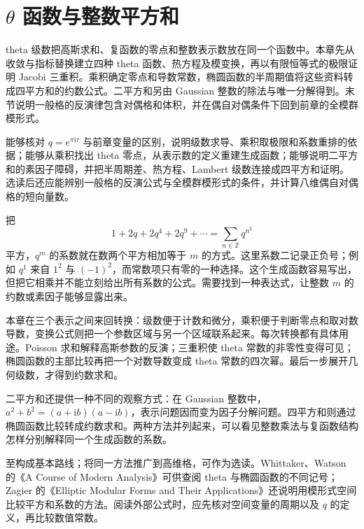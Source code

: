 \chapter{\texorpdfstring{\(\theta\)}{\AnalysisPdfTheta} 函数与整数平方和}
\label{b3:ch:24}
\begin{chapterabstract}
theta 级数把高斯求和、复函数的零点和整数表示数放在同一个函数中。本章先从收敛与指标替换建立四种 theta 函数、热方程及模变换，再以有限恒等式的极限证明 Jacobi 三重积。乘积确定零点和导数常数，椭圆函数的半周期值将这些资料转成四平方和的约数公式。二平方和另由 Gaussian 整数的除法与唯一分解得到。末节说明一般格的反演律包含对偶格和体积，并在偶自对偶条件下回到前章的全模群模形式。
\end{chapterabstract}

\begin{learninggoals}
能够核对 \(q=e^{\pi\mathrm{i}\tau}\) 与前章变量的区别，说明级数求导、乘积取极限和系数重排的依据；能够从乘积找出 theta 零点，从表示数的定义重建生成函数；能够说明二平方和的素因子障碍，并把半周期差、热方程、Lambert 级数连接成四平方和证明。选读后还应能辨别一般格的反演公式与全模群模形式的条件，并计算八维偶自对偶格的短向量数。
\end{learninggoals}

把
\[
1+2q+2q^4+2q^9+\cdots
=\sum_{n\in\mathbb Z}q^{n^2}
\]
平方，\(q^m\) 的系数就在数两个平方相加等于 \(m\) 的方式。这里系数二记录正负号；例如 \(q^1\) 来自 \(1^2\) 与 \((-1)^2\)，而常数项只有零的一种选择。这个生成函数容易写出，但把它相乘并不能立刻给出所有系数的公式。需要找到一种表达式，让整数 \(m\) 的约数或素因子能够显露出来。

本章在三个表示之间来回转换：级数便于计数和微分，乘积便于判断零点和取对数导数，变换公式则把一个参数区域与另一个区域联系起来。每次转换都有具体用途。Poisson 求和解释高斯参数的反演；三重积使 theta 常数的非零性变得可见；椭圆函数的主部比较再把一个对数导数变成 theta 常数的四次幂。最后一步展开几何级数，才得到约数求和。

\ProseParagraphBreak
二平方和还提供一种不同的观察方式：在 Gaussian 整数中，\(a^2+b^2=(a+\mathrm ib)(a-\mathrm ib)\)，表示问题因而变为因子分解问题。四平方和则通过椭圆函数比较转成约数求和。两种方法并列起来，可以看见整数乘法与复函数结构怎样分别解释同一个生成函数的系数。

至构成基本路线；将同一方法推广到高维格，可作为选读。Whittaker、Watson 的《A Course of Modern Analysis》\cite{Whittaker1996Course}可供查阅 theta 与椭圆函数的不同记号；Zagier 的《Elliptic Modular Forms and Their Applications》\cite[pp. 26--28]{Zagier2008Elliptic}还说明用模形式空间比较平方和系数的方法。阅读外部公式时，应先核对空间变量的周期以及 \(q\) 的定义，再比较数值常数。

